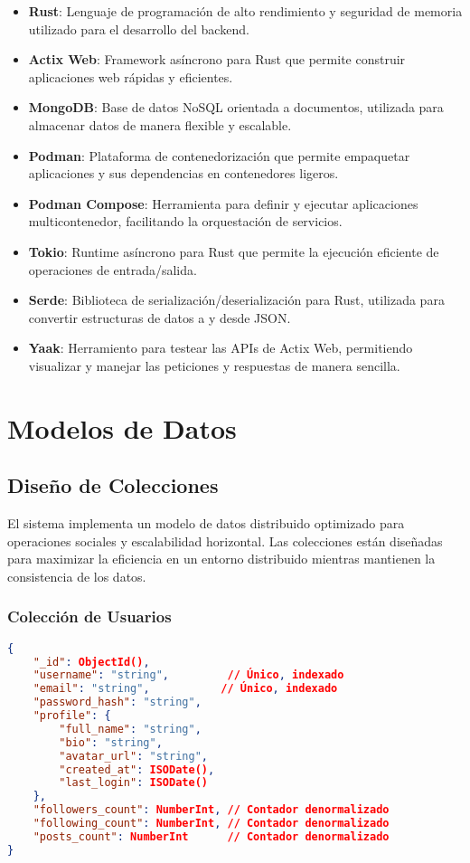 \documentclass[12pt,letterpaper]{article}
\begin{document}
\begin{itemize}
    \item \textbf{Rust}: Lenguaje de programación de alto rendimiento y seguridad de memoria utilizado para el desarrollo del backend.
    \item \textbf{Actix Web}: Framework asíncrono para Rust que permite construir aplicaciones web rápidas y eficientes.
    \item \textbf{MongoDB}: Base de datos NoSQL orientada a documentos, utilizada para almacenar datos de manera flexible y escalable.
    \item \textbf{Podman}: Plataforma de contenedorización que permite empaquetar aplicaciones y sus dependencias en contenedores ligeros.
    \item \textbf{Podman Compose}: Herramienta para definir y ejecutar aplicaciones multicontenedor, facilitando la orquestación de servicios.
    \item \textbf{Tokio}: Runtime asíncrono para Rust que permite la ejecución eficiente de operaciones de entrada/salida.
    \item \textbf{Serde}: Biblioteca de serialización/deserialización para Rust, utilizada para convertir estructuras de datos a y desde JSON.
    \item \textbf{Yaak}: Herramiento para testear las APIs de Actix Web, permitiendo visualizar y manejar las peticiones y respuestas de manera sencilla.

\end{itemize}

\section{Modelos de Datos}
\subsection{Diseño de Colecciones}
El sistema implementa un modelo de datos distribuido optimizado para operaciones sociales y escalabilidad horizontal. Las colecciones están diseñadas para maximizar la eficiencia en un entorno distribuido mientras mantienen la consistencia de los datos.

\subsubsection{Colección de Usuarios}
\begin{lstlisting}[language=json]
{
    "_id": ObjectId(),
    "username": "string",         // Único, indexado
    "email": "string",           // Único, indexado
    "password_hash": "string",
    "profile": {
        "full_name": "string",
        "bio": "string",
        "avatar_url": "string",
        "created_at": ISODate(),
        "last_login": ISODate()
    },
    "followers_count": NumberInt, // Contador denormalizado
    "following_count": NumberInt, // Contador denormalizado
    "posts_count": NumberInt      // Contador denormalizado
}
\end{lstlisting}
\end{document}
